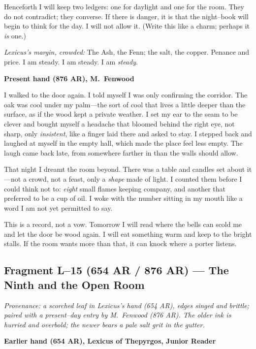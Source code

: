 \documentclass[11pt]{article}
\numberwithin{equation}{section} %
\theoremstyle{plain} %
\theoremstyle{definition} %
\theoremstyle{remark} %
\begin{document}
Henceforth I will keep two ledgers: one for daylight and one for the room. They do not contradict; they converse. If there is danger, it is that the night--book will begin to think for the day. I will not allow it. (Write this like a charm; perhaps it \emph{is} one.)

\medskip
\noindent\textit{Lexicus's margin, crowded:} The Ash, the Fenn; the salt, the copper. Penance and price. I am steady. I am steady. I am \emph{steady}.

\medskip
\noindent\textbf{Present hand (876 AR), M.\ Fenwood}

I walked to the door again. I told myself I was only confirming the corridor. The oak was cool under my palm---the sort of cool that lives a little deeper than the surface, as if the wood kept a private weather. I set my ear to the seam to be clever and bought myself a headache that bloomed behind the right eye, not sharp, only \emph{insistent}, like a finger laid there and asked to stay. I stepped back and laughed at myself in the empty hall, which made the place feel less empty. The laugh came back late, from somewhere farther in than the walls should allow.

That night I dreamt the room beyond. There was a table and candles set about it---not a crowd, not a feast, only a \emph{shape} made of light. I counted them before I could think not to: \emph{eight} small flames keeping company, and another that preferred to be a cup of oil. I woke with the number sitting in my mouth like a word I am not yet permitted to say.

This is a record, not a vow. Tomorrow I will read where the bells can scold me and let the door be wood again. I will eat something warm and keep to the bright stalls. If the room wants more than that, it can knock where a porter listens.

\subsection{Fragment L--15 (654 AR / 876 AR) --- The Ninth and the Open Room}
\label{frag:l15}

\noindent\textit{Provenance: a scorched leaf in Lexicus's hand (654 AR), edges singed and brittle; paired with a present--day entry by M.\ Fenwood (876 AR). The older ink is hurried and overbold; the newer bears a pale salt grit in the gutter.}

\medskip
\noindent\textbf{Earlier hand (654 AR), Lexicus of Thepyrgos, Junior Reader}
\end{document}

